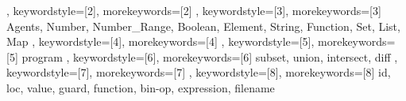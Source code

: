 {{	 }, 
	 keywordstyle=[2]{\asmlstrule}, %
	 morekeywords=[2]{
	 }, 
	 keywordstyle=[3]{\asmlstdomain}, %
	 morekeywords=[3]{
	 	Agents, Number, Number_Range, Boolean, Element, String, Function, Set, List, Map
	 },
	 keywordstyle=[4]{\asmlstpredicate},%
	 morekeywords=[4]{
	 },
	 keywordstyle=[5]{\asmlstfunction}, %
	 morekeywords=[5]{
		program
	 },
	 keywordstyle=[6]{\asmlstderived}, %
	 morekeywords=[6]{
	 subset, union, intersect, diff
	 },
	 keywordstyle=[7]{\asmlstvariable}, %
	 morekeywords=[7]{
	 },
	 keywordstyle=[8]{\asmlstconstant}, %
	 morekeywords=[8]{
	 id, loc, value, guard, function, bin-op, expression, filename
	 }
}
\newcommand{\AsmKeyword}[1]{\lstset{morekeywords=[1]{#1}}}
\newcommand{\AsmRule}[1]{\lstset{morekeywords=[2]{#1}}}
\newcommand{\AsmDomain}[1]{\lstset{morekeywords=[3]{#1}}}
\newcommand{\AsmPredicate}[1]{\lstset{morekeywords=[4]{#1}}}
\newcommand{\AsmFunction}[1]{\lstset{morekeywords=[5]{#1}}}
\newcommand{\AsmDerivedFunction}[1]{\lstset{morekeywords=[6]{#1}}}
\newcommand{\AsmVariable}[1]{\lstset{morekeywords=[7]{#1}}}
\newcommand{\AsmConstantOrEnum}[1]{\lstset{morekeywords=[8]{#1}}}

\newcommand{\asmboxed}[1]{\fontsize{7}{8.4}\ensuremath{\boxed{\hspace{-.175em}#1\hspace{-.175em}}}}